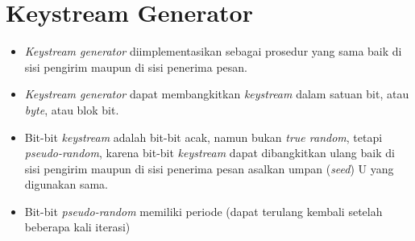 \documentclass{article}
\begin{document}

\section*{Keystream Generator}

\begin{itemize}
    \item \textit{Keystream generator} diimplementasikan sebagai prosedur yang sama baik di sisi pengirim maupun di sisi penerima pesan.
    \item \textit{Keystream generator} dapat membangkitkan \textit{keystream} dalam satuan bit, atau \textit{byte}, atau blok bit.
    \item Bit-bit \textit{keystream} adalah bit-bit acak, namun bukan \textit{true random}, tetapi \textit{pseudo-random}, karena bit-bit \textit{keystream} dapat dibangkitkan ulang baik di sisi pengirim maupun di sisi penerima pesan asalkan umpan (\textit{seed}) U yang digunakan sama.
    \item Bit-bit \textit{pseudo-random} memiliki periode (dapat terulang kembali setelah beberapa kali iterasi)
\end{itemize}
\end{document}
